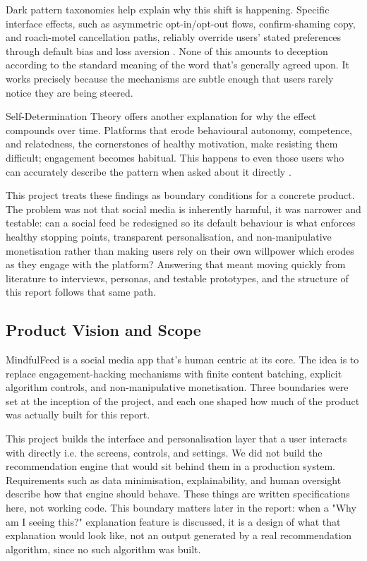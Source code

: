 \documentclass[11pt]{article}
\begin{document}
Dark pattern taxonomies help explain why this shift is happening. Specific interface effects, such as asymmetric opt-in/opt-out flows, confirm-shaming copy, and roach-motel cancellation paths, reliably override users' stated preferences through default bias and loss aversion \parencites[2]{4807303}. None of this amounts to deception according to the standard meaning of the word that's generally agreed upon. It works precisely because the mechanisms are subtle enough that users rarely notice they are being steered.

Self-Determination Theory offers another explanation for why the effect compounds over time. Platforms that erode behavioural autonomy, competence, and relatedness, the cornerstones of healthy motivation, make resisting them difficult; engagement becomes habitual. This happens to even those users who can accurately describe the pattern when asked about it directly \parencites[8]{2404919}.

This project treats these findings as boundary conditions for a concrete product. The problem was not that social media is inherently harmful, it was narrower and testable: can a social feed be redesigned so its default behaviour is what enforces healthy stopping points, transparent personalisation, and non-manipulative monetisation rather than making users rely on their own willpower which erodes as they engage with the platform? Answering that meant moving quickly from literature to interviews, personas, and testable prototypes, and the structure of this report follows that same path.

\subsection{Product Vision and Scope}
MindfulFeed is a social media app that's human centric at its core. The idea is to replace engagement-hacking mechanisms with finite content batching, explicit algorithm controls, and non-manipulative monetisation. Three boundaries were set at the inception of the project, and each one shaped how much of the product was actually built for this report.

This project builds the interface and personalisation layer that a user interacts with directly i.e. the screens, controls, and settings. We did not build the recommendation engine that would sit behind them in a production system. Requirements such as data minimisation, explainability, and human oversight describe how that engine should behave. These things are written specifications here, not working code. This boundary matters later in the report: when a "Why am I seeing this?" explanation feature is discussed, it is a design of what that explanation would look like, not an output generated by a real recommendation algorithm, since no such algorithm was built.
\end{document}
